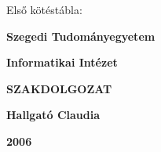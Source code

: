 \documentclass[12pt]{report}
\begin{document}
\thispagestyle{empty}
Első kötéstábla:

\begin{center}
{\Large\bf Szegedi Tudományegyetem}

\vspace{0.5cm}

{\Large\bf Informatikai Intézet}

\vspace*{8.5cm}


{\Huge\bf SZAKDOLGOZAT}


\vspace*{7cm}

{\LARGE\bf Hallgató Claudia}

\vspace*{0.6cm}

{\Large\bf 2006}

\end{center}
\end{document}
